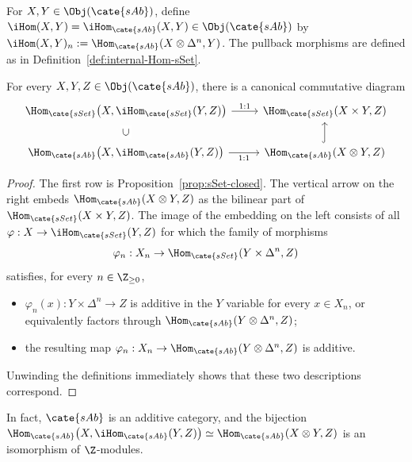 \begin{definition}
	For $X,Y\in\Obj(\cate{sAb})$, define
	$\iHom(X,Y)=\iHom_{\cate{sAb}}(X,Y)\in\Obj(\cate{sAb})$ by
	$\iHom(X,Y)_n:=\Hom_{\cate{sAb}}(X\otimes\Delta^n,Y)$.
	The pullback morphisms are defined as in
	Definition~\ref{def:internal-Hom-sSet}.
\end{definition}

\begin{proposition}\label{prop:sAb-closed}
	For every $X,Y,Z\in\Obj(\cate{sAb})$, there is a canonical commutative
	diagram
	\[\begin{tikzcd}
		\Hom_{\cate{sSet}}\bigl(X,\iHom_{\cate{sSet}}(Y,Z)\bigr)
		\arrow[r,"1:1"]
		&\Hom_{\cate{sSet}}(X\times Y,Z)\\
		\Hom_{\cate{sAb}}\bigl(X,\iHom_{\cate{sAb}}(Y,Z)\bigr)
		\arrow[r,"1:1"']
		\arrow[phantom,u,"\subset" description,sloped]
		&\Hom_{\cate{sAb}}(X\otimes Y,Z)\arrow[hookrightarrow,u]
	\end{tikzcd}\]
\end{proposition}
\begin{proof}
	The first row is Proposition~\ref{prop:sSet-closed}. The vertical arrow on
	the right embeds $\Hom_{\cate{sAb}}(X\otimes Y,Z)$ as the bilinear part
	of $\Hom_{\cate{sSet}}(X\times Y,Z)$. The image of the embedding on the
	left consists of all $\varphi:X\to\iHom_{\cate{sSet}}(Y,Z)$ for which
	the family of morphisms
	\[
	\varphi_n:X_n\to\Hom_{\cate{sSet}}(Y\times\Delta^n,Z)
	\]
	satisfies, for every $n\in\Z_{\geq0}$,
	\begin{itemize}
		\item $\varphi_n(x):Y\times\Delta^n\to Z$ is additive in the $Y$
		variable for every $x\in X_n$, or equivalently factors through
		$\Hom_{\cate{sAb}}(Y\otimes\Delta^n,Z)$;
		\item the resulting map
		$\varphi_n:X_n\to\Hom_{\cate{sAb}}(Y\otimes\Delta^n,Z)$ is additive.
	\end{itemize}
	Unwinding the definitions immediately shows that these two descriptions
	correspond.
\end{proof}

In fact, $\cate{sAb}$ is an additive category, and the bijection
$\Hom_{\cate{sAb}}\bigl(X,\iHom_{\cate{sAb}}(Y,Z)\bigr)
\simeq\Hom_{\cate{sAb}}(X\otimes Y,Z)$ is an isomorphism of $\Z$-modules.


